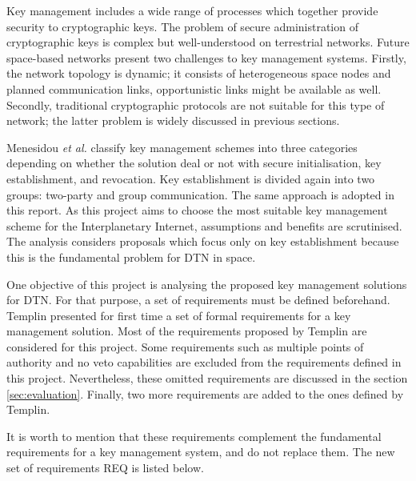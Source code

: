   Key management includes a wide range of processes which together provide security to cryptographic keys.  The problem of secure administration of cryptographic keys is complex but well-understood on terrestrial networks. Future space-based networks present two challenges to key management systems. Firstly, the network topology is dynamic; it consists of heterogeneous space nodes and planned communication links, opportunistic links might be available as well. Secondly, traditional cryptographic protocols are not suitable for this type of network; the latter problem is widely discussed in previous sections.%

Menesidou \textit{et al.} \cite{menesidou2017cryptographic} classify key management schemes into three categories depending on whether the solution deal or not with secure initialisation, key establishment, and revocation. Key establishment is divided again into two groups: two-party and group communication. The same approach is adopted in this report. As this project aims to choose the most suitable key management scheme for the Interplanetary Internet, assumptions and benefits are scrutinised. The analysis considers proposals which focus only on key establishment because this is the fundamental problem for DTN in space.

One objective of this project is analysing the proposed key management solutions for DTN. For that purpose, a set of requirements must be defined beforehand. Templin \cite{templin-dtnskmreq-00} presented for first time a set of formal requirements for a key management solution. Most of the requirements proposed by Templin are considered for this project. Some requirements such as multiple points of authority and no veto capabilities are excluded from the requirements defined in this project. Nevertheless, these omitted requirements are discussed in the section \ref{sec:evaluation}. Finally, two more requirements are added to the ones defined by Templin. 

It is worth to mention that these requirements complement the fundamental requirements for a key management system, and do not replace them. The new set of requirements REQ is listed below.
  


